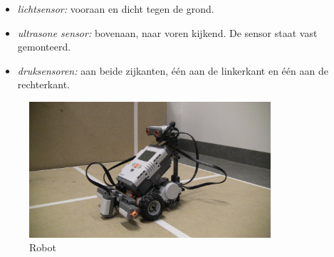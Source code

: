 \documentclass[tt3]{penoverslag}
\begin{document}
\begin{itemize}
\item \textit{lichtsensor:} vooraan en dicht tegen de grond.
\item \textit{ultrasone sensor:} bovenaan, naar voren kijkend. De sensor staat vast gemonteerd.
\item \textit{druksensoren:} aan beide zijkanten, \'e\'en aan de linkerkant en \'e\'en aan de rechterkant.
\end{itemize}

\begin{figure}[tbp]
\begin{center}
    \includegraphics[width=0.8\textwidth]{robot}
    \caption{Robot}
    \label{robot}
\end{center}
\end{figure}
\end{document}
